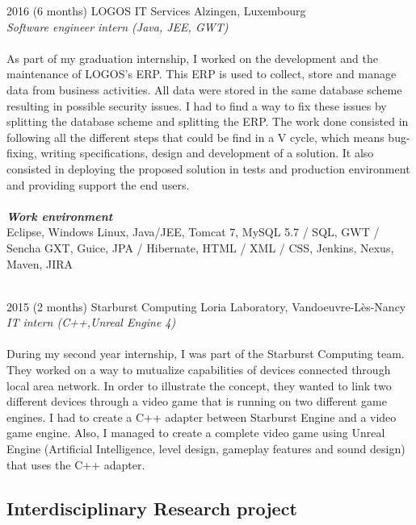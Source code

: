 \documentclass[]{friggeri-cv} %
\begin{document}
\begin{entrylist}

\entry 
{2016 (6 months)}
{LOGOS IT Services}
{Alzingen, Luxembourg}
{\\ \emph{Software engineer intern (Java, JEE, GWT)} \\ \\
As part of my graduation internship, I worked on the development and the maintenance of LOGOS's ERP. This ERP is used to collect, store and manage data from business activities. All data were stored in the same database scheme resulting in possible security issues. I had to find a way to fix these issues by splitting the database scheme and splitting the ERP. The work done consisted in following all the different steps that could be find in a V cycle, which means bug-fixing, writing specifications, design and development of a solution. It also consisted in deploying the proposed solution in tests and production environment and providing support the end users.\\
\\ \textit{\textbf{Work environment }} \\ 
Eclipse, Windows Linux, Java/JEE, Tomcat 7, MySQL 5.7 / SQL, GWT / Sencha 
GXT, Guice, JPA / Hibernate, HTML / XML / CSS, Jenkins, Nexus, Maven, JIRA}

\entry
{\\2015 (2 months)}
{Starburst Computing}
{Loria Laboratory, Vandoeuvre-Lès-Nancy}
{\\ \emph{IT intern (C++,Unreal Engine 4)} \\ \\
During my second year internship, I was part of the Starburst Computing team. They worked on a way to mutualize capabilities of devices connected through local area network. In order to illustrate the concept, they wanted to link two different devices through a video game that is running on two different game engines. I had to create a C++ adapter between Starburst Engine and a video game engine. Also, I managed to create a complete video game using Unreal Engine (Artificial Intelligence, level design, gameplay features and sound design) that uses the C++ adapter.  
}


\end{entrylist}

\subsection{Interdisciplinary Research project}
\end{document}
